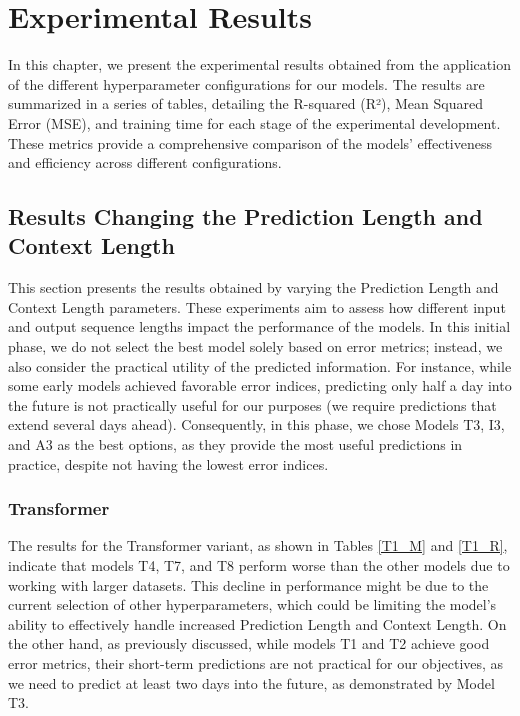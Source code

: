 \chapter{Experimental Results}
\pagestyle{esitscCD}

In this chapter, we present the experimental results obtained from the application of the different hyperparameter configurations for our models. The results are summarized in a series of tables, detailing the R-squared (R²), Mean Squared Error (MSE), and training time for each stage of the experimental development. These metrics provide a comprehensive comparison of the models' effectiveness and efficiency across different configurations.

\section{Results Changing the Prediction Length and Context Length}
This section presents the results obtained by varying the Prediction Length and Context Length parameters. These experiments aim to assess how different input and output sequence lengths impact the performance of the models.
In this initial phase, we do not select the best model solely based on error metrics; instead, we also consider the practical utility of the predicted information. For instance, while some early models achieved favorable error indices, predicting only half a day into the future is not practically useful for our purposes (we require predictions that extend several days ahead). Consequently, in this phase, we chose Models T3, I3, and A3 as the best options, as they provide the most useful predictions in practice, despite not having the lowest error indices.

\subsection{Transformer}
The results for the Transformer variant, as shown in Tables \ref{T1_M} and \ref{T1_R}, indicate that models T4, T7, and T8 perform worse than the other models due to working with larger datasets. This decline in performance might be due to the current selection of other hyperparameters, which could be limiting the model's ability to effectively handle increased Prediction Length and Context Length. On the other hand, as previously discussed, while models T1 and T2 achieve good error metrics, their short-term predictions are not practical for our objectives, as we need to predict at least two days into the future, as demonstrated by Model T3.

